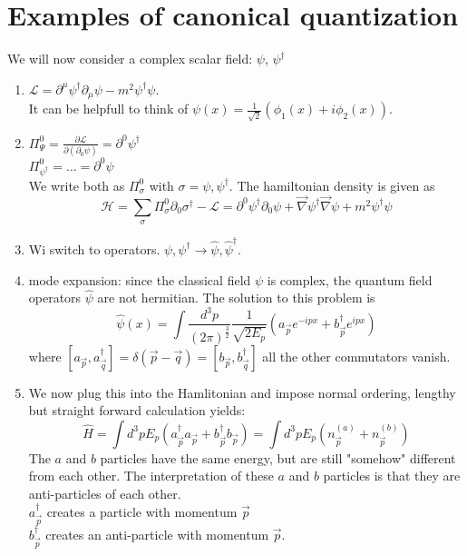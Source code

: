 \documentclass{report}
\begin{document}
\chapter{Examples of canonical quantization}
We will now consider a complex scalar field: $\psi $, $\psi^\dagger$
\begin{enumerate}
	\item $\mathcal{L} = \partial^\mu \psi^\dagger \partial_\mu \psi - m^2 \psi^\dagger \psi $.\\
		It can be helpfull to think of $\psi(x) = \frac{1}{\sqrt{2} } \left( \phi_1(x) + i \phi_2(x) \right) $.
	\item $\Pi^0_\Psi = \frac{\partial \mathcal{L}}{\partial (\partial_0 \psi ) } = \partial^0 \psi^\dagger  $ \\
		$\Pi^0_{\psi^\dagger} = \ldots = \partial^0 \psi $ \\
		We write both as $\Pi^0_\sigma$ with $\sigma = \psi, \psi^\dagger$. The hamiltonian density is given as \[
			\mathcal{H} = \sum_{\sigma } \Pi^0_\sigma \partial_0 \sigma^\dagger - \mathcal{L} = \partial^0 \psi^\dagger \partial_0 \psi + \vec{\nabla } \psi^\dagger \vec{\nabla }\psi + m^2 \psi^\dagger \psi  
		\] 
	\item Wi switch to operators. $\psi, \psi^\dagger \to \hat{\psi}, \hat{\psi }^\dagger$.
	\item mode expansion: since the classical field $\psi $ is complex, the quantum field operators $\hat{\psi }$ are not hermitian. The solution to this problem is \[
			\hat{\psi }(x) = \int \frac{d^3p}{\left( 2 \pi \right)^{\frac{3}{2}}} \frac{1}{\sqrt{2 E_p} } \left( a_{\vec{p}} e^{-ipx} + b_{\vec{p}}^\dagger e^{ipx} \right) 
		\] where $[a_{\vec{p}}, a_{\vec{q}}^\dagger] = \delta\left( \vec{p} - \vec{q} \right) = [b_{\vec{p}}, b_{\vec{q}}^\dagger] $ all the other commutators vanish. \\
	\item We now plug this into the Hamlitonian and impose normal ordering, lengthy but straight forward calculation yields: \[
			\hat{H} = \int d^3p E_p\left( a_{\vec{p}}^\dagger a_{\vec{p}} + b_{\vec{p}}^\dagger b_{\vec{p}} \right) = \int d^3p E_p \left( n_{\vec{p}}^{(a)} + n_{\vec{p}}^{(b)} \right) 
	\]  The $a$ and $b$ particles have the same energy, but are still "somehow" different from each other. The interpretation of these $a$ and $b$ particles is that they are anti-particles of each other.\\
	$a_{\vec{p}}^\dagger$ creates a particle with momentum $\vec{p}$\\
	$b_{\vec{p}}^\dagger$ creates an anti-particle with momentum  $\vec{p}$.
\end{enumerate}
\end{document}
